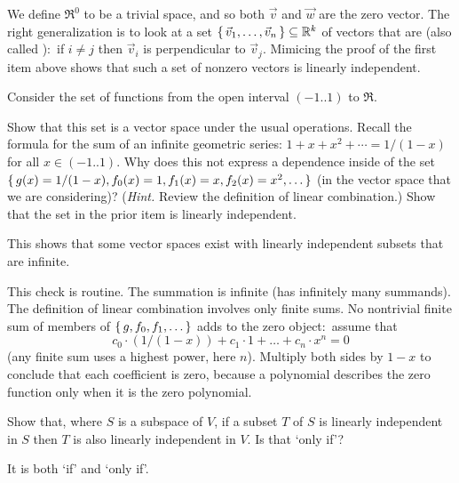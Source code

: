 \begin{exercises}
\begin{answer}
\begin{exparts}
           We define \( \Re^0 \) to be a trivial space, and so both $\vec{v}$
           and $\vec{w}$ are the zero vector.
         \partsitem The right generalization is to look at a set
           \( \mbox{$\{\,\vec{v}_1,\dots,\vec{v}_n\,\}$}\subseteq\mathbb{R}^k \) of vectors
           that are  
           (also called ):~if
           \( i\neq j \) then \( \vec{v}_i \) is perpendicular to
           \( \vec{v}_j \).
           Mimicing the proof of the first item above shows that such a set of
           nonzero vectors is linearly independent.
      \end{exparts}  
    \end{answer}
  \item 
    Consider the set of functions from the open interval $(-1..1)$ 
    to $\Re$.
    \begin{exparts}
      \partsitem Show that 
         this set is a vector space under the usual operations.
      \partsitem Recall the formula for the sum of an infinite geometric 
         series: 
         \( 1+x+x^2+\cdots=1/(1-x) \) for all \( x\in(-1..1) \).
         Why does this not express a dependence inside of
         the set $\mbox{$\{\,g(x)=1/(1-x),f_0(x)=1,f_1(x)=x,f_2(x)=x^2,\ldots\,\}$}$
         (in the vector space that we are considering)?
         (\textit{Hint.}
         Review the definition of linear combination.)
      \partsitem Show that the set in the prior item is linearly independent.
    \end{exparts}
    This shows that some vector spaces exist with linearly independent subsets
    that are infinite.
    \begin{answer}
      \begin{exparts}
        \partsitem This check is routine.
        \partsitem The summation is infinite (has infinitely many summands).
          The definition of linear combination involves only finite sums.
        \partsitem No nontrivial finite sum of members of 
           \( \mbox{$\{\,g,f_0,f_1,\ldots\,\}$} \) adds to the zero object:~assume that
           \begin{equation*}
              c_0\cdot (1/(1-x))+c_1\cdot 1+\dots+c_n\cdot x^n=0
           \end{equation*}
           (any finite sum uses a highest power, here \( n \)).
           Multiply both sides by \( 1-x \) to conclude that each coefficient 
           is zero, because a polynomial describes the zero function only when 
           it is the zero polynomial.
      \end{exparts}
     \end{answer}
  \item 
    Show that, where \( S \) is a subspace of \( V \), if a subset $T$ of
    \( S \) is linearly independent in \( S \) then $T$ is also linearly
    independent in \( V \).
    Is that `only if'?
    \begin{answer}
      It is both `if' and `only if'.


\end{answer}
\end{exercises}
